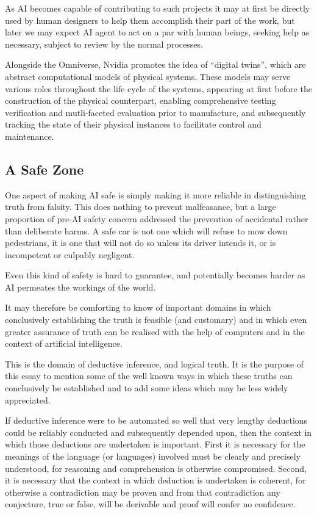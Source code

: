 \documentclass[10pt,titlepage]{book}
\begin{document}
As AI becomes capable of contributing to such projects it may at first be directly used by human designers to help them accomplish their part of the work, but later we may expect AI agent to act on a par with human beings, seeking help as necessary, subject to review by the normal processes.

Alongside the Omniverse, Nvidia promotes the idea of ``digital twins'', which are abstract computational models of physical systems.
These models may serve various roles throughout the life cycle of the systems, appearing at first before the construction of the physical counterpart, enabling comprehensive testing verification and mutli-faceted evaluation prior to manufacture, and subsequently tracking the state of their physical instances to facilitate control and maintenance.

\subsection{A Safe Zone}

One aspect of making AI safe is simply making it more reliable in distinguishing truth from falsity.
This does nothing to prevent malfeasance, but a large proportion of pre-AI safety concern addressed the prevention of accidental rather than deliberate harms.
A safe car is not one which will refuse to mow down pedestrians, it is one that will not do so unless its driver intends it, or is incompetent or culpably negligent.

Even this kind of safety is hard to guarantee, and potentially becomes harder as AI permeates the workings of the world.

It may therefore be comforting to know of important domains in which conclusively establishing the truth is feasible (and customary) and in which even greater assurance of truth can be realised with the help of computers and in the context of artificial intelligence.

This is the domain of deductive inference, and logical truth.
It is the purpose of this essay to mention some of the well known ways in which these truths can conclusively be established and to add some ideas which may be less widely appreciated.

If deductive inference were to be automated so well that very lengthy deductions could be reliably conducted and subsequently depended upon, then the context in which those deductions are undertaken is important.
First it is necessary for the meanings of the language (or languages) involved must be clearly and precisely understood, for reasoning and comprehension is otherwise compromised.
Second, it is necessary that the context in which deduction is undertaken is coherent, for otherwise a contradiction may be proven and from that contradiction any conjecture, true or false, will be derivable and proof will confer no confidence.
\end{document}
